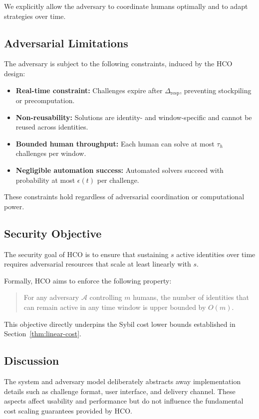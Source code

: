 \documentclass[sigconf,nonacm]{acmart}
\begin{document}
We explicitly allow the adversary to coordinate humans optimally and to adapt strategies over time.

\subsection{Adversarial Limitations}

The adversary is subject to the following constraints, induced by the HCO design:

\begin{itemize}
	\item \textbf{Real-time constraint:} Challenges expire after $\Delta_{\mathrm{resp}}$, preventing stockpiling or precomputation.
	\item \textbf{Non-reusability:} Solutions are identity- and window-specific and cannot be reused across identities.
	\item \textbf{Bounded human throughput:} Each human can solve at most $\tau_h$ challenges per window.
	\item \textbf{Negligible automation success:} Automated solvers succeed with probability at most $\epsilon(t)$ per challenge.
\end{itemize}

These constraints hold regardless of adversarial coordination or computational power.

\subsection{Security Objective}

The security goal of HCO is to ensure that sustaining $s$ active identities over time requires adversarial resources that scale at least linearly with $s$.

Formally, HCO aims to enforce the following property:
\begin{quote}
	For any adversary $\mathcal{A}$ controlling $m$ humans, the number of identities that can remain active in any time window is upper bounded by $O(m)$.
\end{quote}

This objective directly underpins the Sybil cost lower bounds established in Section~\ref{thm:linear-cost}.

\subsection{Discussion}

The system and adversary model deliberately abstracts away implementation details such as challenge format, user interface, and delivery channel. These aspects affect usability and performance but do not influence the fundamental cost scaling guarantees provided by HCO.
\end{document}
